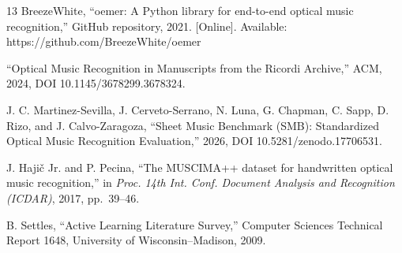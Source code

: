 \begin{thebibliography}{13}
BreezeWhite, ``oemer: A Python library for end-to-end optical music
recognition,'' GitHub repository, 2021. [Online]. Available:
https://github.com/BreezeWhite/oemer %

``Optical Music Recognition in Manuscripts from the Ricordi Archive,''
ACM, 2024, DOI 10.1145/3678299.3678324. %

J. C. Martinez-Sevilla, J. Cerveto-Serrano, N. Luna, G. Chapman, C. Sapp,
D. Rizo, and J. Calvo-Zaragoza, ``Sheet Music Benchmark (SMB): Standardized
Optical Music Recognition Evaluation,'' 2026, DOI 10.5281/zenodo.17706531.

J. Haji\v{c} Jr. and P. Pecina, ``The MUSCIMA++ dataset for handwritten
optical music recognition,'' in \emph{Proc. 14th Int. Conf. Document
Analysis and Recognition (ICDAR)}, 2017, pp.~39--46. %

B. Settles, ``Active Learning Literature Survey,'' Computer Sciences
Technical Report 1648, University of Wisconsin--Madison, 2009. %

\end{thebibliography}


